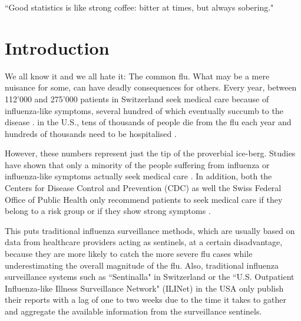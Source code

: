 \documentclass[11pt, a4paper,twoside]{report}\usepackage[]{graphicx}\usepackage[]{color}
\begin{document}

\vfill

\begin{center}
``Good statistics is like strong coffee: bitter at times, but always sobering."
\end{center}

\thispagestyle{empty}
\cleardoublepage

\tableofcontents
\cleardoublepage


\chapter{Introduction}
\label{ch:intro}
\setcounter{page}{0}
We all know it and we all hate it: The common flu. What may be a mere nuisance for some, can have deadly consequences for others. Every year, between 112'000 and 275'000 patients in Switzerland seek medical care because of influenza-like symptoms, several hundred of which eventually succumb to the disease \citep{bag_lagebericht_2017}. in the U.S., tens of thousands of people die from the flu each year and hundreds of thousands need to be hospitalised \citep{rolfes_estimated_2016}.

However, these numbers represent just the tip of the proverbial ice-berg. Studies have shown that only a minority of the people suffering from influenza or influenza-like symptoms actually seek medical care \citep{goff_surveillance_2015}. In addition, both the Centers for Disease Control and Prevention (CDC) as well the Swiss Federal Office of Public Health only recommend patients to seek medical care if they belong to a risk group or if they show strong symptoms \citep{bag_grippe_2016,cdc_flu_2017}.

This puts traditional influenza surveillance methods, which are usually based on data from healthcare providers acting as sentinels, at a certain disadvantage, because they are more likely to catch the more severe flu cases while underestimating the overall magnitude of the flu. Also, traditional influenza surveillance systems such as ``Sentinalla" in Switzerland \citep{bag_influenza_2017, sentinella_2017} or the ``U.S. Outpatient Influenza-like Illness Surveillance Network" (ILINet) in the USA \citep{cdc_surveillance_2016} only publish their reports with a lag of one to two weeks due to the time it takes to gather and aggregate the available information from the surveillance sentinels.
\end{document}
